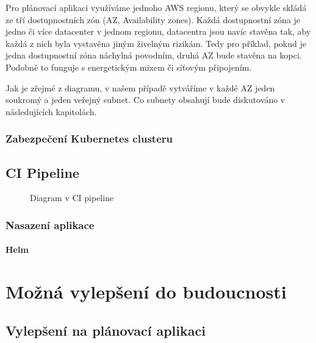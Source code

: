 \documentclass[thesis=M,czech]{FITthesis}[2019/12/23]
\theoremstyle{plain}
\theoremstyle{definition}
\begin{document}
Pro plánovací aplikaci využíváme jednoho AWS regionu, který se obvykle skládá ze tří dostupnostních zón (AZ, Availability zones)\cite{aws-azs}. Každá dostupnostní zóna je jedno či více datacenter v jednom regionu, datacentra jsou navíc stavěna tak, aby každá z nich byla vystavěna jiným živelným rizikám. Tedy pro příklad, pokud je jedna dostupnostní zóna náchylná povodním, druhá AZ bude stavěna na kopci. Podobně to funguje s energetickým mixem či síťovým připojením. 


Jak je zřejmé z diagramu, v našem případě vytváříme v každé AZ jeden soukromý a jeden veřejný subnet. Co subnety obsahují bude diskutováno v následujících kapitolách.

\subsection{Zabezpečení Kubernetes clusteru}



\section{CI Pipeline}



\begin{figure}[H]\centering
	

	\caption[Diagram v CI pipeline]{Diagram v CI pipeline}\label{fig:float}
\end{figure}


\subsection{Nasazení aplikace}
\subsubsection{Helm}



\chapter{Možná vylepšení do budoucnosti}


\section{Vylepšení na plánovací aplikaci}
\end{document}
